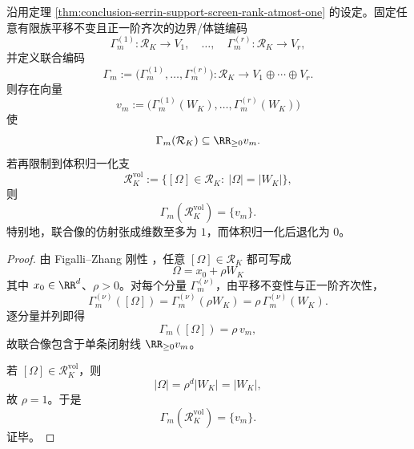 \begin{theorem}\label{thm:conclusion-serrin-support-joint-screen-ray}
沿用定理 \ref{thm:conclusion-serrin-support-screen-rank-atmost-one} 的设定。固定任意有限族平移不变且正一阶齐次的边界/体链编码
\[
\Gamma_m^{(1)}:\mathcal R_K\to V_1,\quad \dots,\quad \Gamma_m^{(r)}:\mathcal R_K\to V_r,
\]
并定义联合编码
\[
\Gamma_m
:=
\bigl(\Gamma_m^{(1)},\dots,\Gamma_m^{(r)}\bigr):
\mathcal R_K\to V_1\oplus\cdots\oplus V_r.
\]
则存在向量
\[
v_m
:=
\bigl(\Gamma_m^{(1)}(W_K),\dots,\Gamma_m^{(r)}(W_K)\bigr)
\]
使
\[
\Gamma_m(\mathcal R_K)\subseteq \RR_{\ge0}v_m.
\]
若再限制到体积归一化支
\[
\mathcal R_K^{\mathrm{vol}}
:=
\{[\Omega]\in\mathcal R_K:\ |\Omega|=|W_K|\},
\]
则
\[
\Gamma_m(\mathcal R_K^{\mathrm{vol}})=\{v_m\}.
\]
特别地，联合像的仿射张成维数至多为 \(1\)，而体积归一化后退化为 \(0\)。
\end{theorem}
\begin{proof}
由 Figalli--Zhang 刚性 \cite{FigalliZhang2026AnisotropicSerrinGeneralDomains}，任意 \([\Omega]\in\mathcal R_K\) 都可写成
\[
\Omega=x_0+\rho W_K
\]
其中 \(x_0\in\RR^d\)、\(\rho>0\)。对每个分量 \(\Gamma_m^{(\nu)}\)，由平移不变性与正一阶齐次性，
\[
\Gamma_m^{(\nu)}([\Omega])
=
\Gamma_m^{(\nu)}(\rho W_K)
=
\rho\,\Gamma_m^{(\nu)}(W_K).
\]
逐分量并列即得
\[
\Gamma_m([\Omega])=\rho\,v_m,
\]
故联合像包含于单条闭射线 \(\RR_{\ge0}v_m\)。

若 \([\Omega]\in\mathcal R_K^{\mathrm{vol}}\)，则
\[
|\Omega|=\rho^d|W_K|=|W_K|,
\]
故 \(\rho=1\)。于是
\[
\Gamma_m(\mathcal R_K^{\mathrm{vol}})=\{v_m\}.
\]
证毕。
\end{proof}

